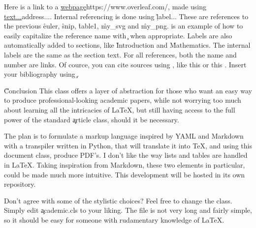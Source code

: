\documentclass[onecolumn]{tome}
\begin{document}

Here is a link to a \url{webpage}{https://www.overleaf.com/}, made using \c{\url{text...}{address...}}. Internal referencing is done using \c{\r{label...}} These are references to the previous \r{euler}, \r{snip}, \r{table1}, \r{my_svg} and \r{my_png}.  is an example of how to easily capitalize the reference name with \c{} when appropriate. Labels are also automatically added to sections, like \r{Introduction} and \r{Mathematics}. The internal labels are the same as the section text. For all references, both the name and number are links. Of cource, you can cite sources using \c{\cite{...}}, like this \cite{minted} or this \cite{tabularray}. Insert your bibliography using \c{}.

\H{Conclusion}
This class offers a layer of abstraction for those who want an easy way to produce professional-looking academic papers, while not worrying too much about learning all the intricacies of LaTeX, but still having access to the full power of the standard \c{article} class, should it be necessary.

The plan is to formulate a markup language inspired by YAML and Markdown with a transpiler written in Python, that will translate it into TeX, and using this document class, produce PDF's. I don't like the way lists and tables are handled in LaTeX. Taking inspiration from Markdown, these two elements in particular, could be made much more intuitive. This development will be hosted in its own repository.

Don't agree with some of the stylistic choices? Feel free to change the class. Simply edit \c{academic.cls} to your liking. The file is not very long and fairly simple, so it should be easy for someone with rudamentary knowledge of LaTeX.
\end{document}
